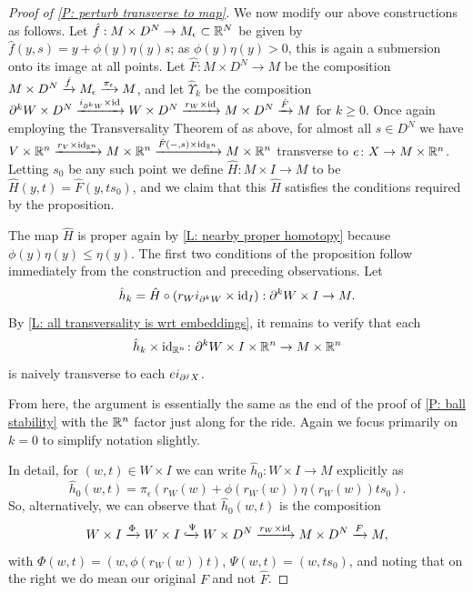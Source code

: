 \begin{proof}[Proof of \cref{P: perturb transverse to map}]
	We now modify our above constructions as follows.
	Let $\hat f: M \times D^N \to M_\epsilon \subset \mathbb{R}^N$ be given by $\hat f(y, s) = y +\phi(y) \eta(y) s$; as $\phi(y)\eta(y)>0$, this is again a submersion onto its image at all points.
	Let $\hat F \colon M \times D^N \to M$ be the composition $M \times D^N \xrightarrow{\hat f} M_\epsilon \xrightarrow{\pi_\epsilon} M$, and let $\hat \Upsilon_k$ be the composition $\partial^k W \times D^N \xrightarrow{i_{\partial^k W} \times \mathrm{id}} W \times D^N \xrightarrow{r_W \times \mathrm{id}} M \times D^N \xrightarrow{\hat F} M$ for $k\geq 0$.
	Once again employing the Transversality Theorem of \cite[Section 2.3]{GuPo74} as above, for almost all $s \in D^N$ we have $V \times \mathbb{R}^n \xrightarrow{r_V \times \mathrm{id}_{\mathbb{R}^n}} M \times \mathbb{R}^n \xrightarrow{\hat F(-,s) \times \mathrm{id}_{\mathbb{R}^n}} M \times \mathbb{R}^n$ transverse to $e \colon X \to M \times \mathbb{R}^n$.
	Letting $s_0$ be any such point we define $\hat H \colon M \times I \to M$ to be $\hat H(y,t) = \hat F(y,ts_0)$, and we claim that this $\hat H$ satisfies the conditions required by the proposition.

	The map $\hat H$ is proper again by \cref{L: nearby proper homotopy} because $\phi(y) \eta(y) \leq \eta(y)$.
	The first two conditions of the proposition follow immediately from the construction and preceding observations.
	Let $$\hat h_k = \hat H \circ (r_W i_{\partial^k W} \times \mathrm{id}_I): \partial^k W \times I \to M.$$
	By \cref{L: all transversality is wrt embeddings}, it remains to verify that each $$\hat h_k \times \mathrm{id}_{\mathbb{R}^n} \colon \partial^k W \times I \times \mathbb{R}^n \to M \times \mathbb{R}^n$$ is naively transverse to each $ei_{\partial^j X}$.

	From here, the argument is essentially the same as the end of the proof of \cref{P: ball stability} with the $\mathbb{R}^n$ factor just along for the ride.
	Again we focus primarily on $k=0$ to simplify notation slightly.

	In detail, for $(w,t) \in W \times I$ we can write $\hat h_0 \colon W \times I \to M$ explicitly as
	$$\hat h_0(w,t) = \pi_\epsilon(r_W(w)+\phi(r_W(w))\eta(r_W(w))ts_0).$$
	So, alternatively, we can observe that $\hat h_0 (w,t)$ is the composition
	\begin{equation}\label{E: perturb transverse to map}
		W \times I \xrightarrow{\Phi} W \times I \xhookrightarrow{\Psi} W \times D^N \xrightarrow{r_W \times \mathrm{id}} M \times D^N \xrightarrow{F} M,
	\end{equation}
	with $\Phi(w,t) = (w,\phi(r_W(w))t)$, $\Psi(w,t) = (w,ts_0)$, and noting that on the right we do mean our original $F$ and not $\hat F$.


\end{proof}
